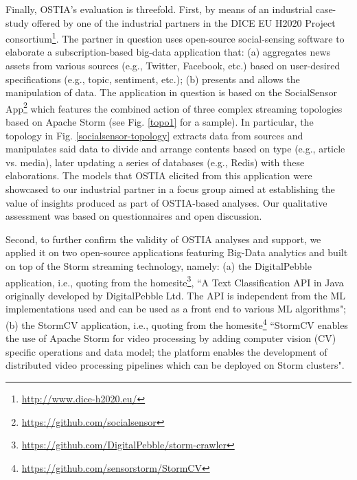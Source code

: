 Finally, OSTIA's evaluation is threefold. 
First, by means of an industrial case-study offered by one of the industrial partners in the DICE EU H2020 Project consortium\footnote{\url{http://www.dice-h2020.eu/}}. 
The partner in question uses open-source social-sensing software to elaborate a subscription-based big-data application that: (a) aggregates news assets from various sources (e.g., Twitter, Facebook, etc.) based on user-desired specifications (e.g., topic, sentiment, etc.); (b) presents and allows the manipulation of data. The application in question is based on the SocialSensor App\footnote{\url{https://github.com/socialsensor}} which features the combined action of three complex streaming topologies based on Apache Storm (see Fig. \ref{topo1} for a sample).
In particular, the topology in Fig. \ref{socialsensor-topology} extracts data from sources and manipulates said data to divide and arrange contents based on type (e.g., article vs. media), later updating a series of databases (e.g., Redis) with these elaborations. The models that OSTIA elicited from this application were showcased to our industrial partner in a focus group aimed at establishing the value of insights produced as part of OSTIA-based analyses. Our qualitative assessment was based on questionnaires and open discussion.

Second, to further confirm the validity of OSTIA analyses and support, we applied it on two open-source applications featuring Big-Data analytics and built on top of the Storm streaming technology, namely: (a) the DigitalPebble application, i.e., quoting from the homesite\footnote{\url{https://github.com/DigitalPebble/storm-crawler}}, ``A Text Classification API in Java originally developed by DigitalPebble Ltd. The API is independent from the ML implementations used and can be used as a front end to various ML algorithms"; (b) the StormCV application, i.e., quoting from the homesite\footnote{\url{https://github.com/sensorstorm/StormCV}} ``StormCV enables the use of Apache Storm for video processing by adding computer vision (CV) specific operations and data model; the platform enables the development of distributed video processing pipelines which can be deployed on Storm clusters".


